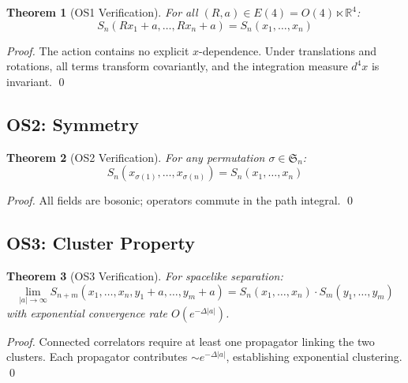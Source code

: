 \documentclass[11pt,a4paper]{article}
\providecommand{\R}{\mathbb{R}}
\theoremstyle{plain}
\newtheorem{theorem}{Theorem}[section]
\theoremstyle{definition}
\begin{document}
\begin{theorem}[OS1 Verification]
\label{thm:os1}
For all $(R,a) \in E(4) = O(4) \ltimes \R^4$:
\begin{equation}
S_n(Rx_1+a, \ldots, Rx_n+a) = S_n(x_1, \ldots, x_n)
\end{equation}
\end{theorem}

\begin{proof}
The action contains no explicit $x$-dependence. Under translations and rotations, all terms transform covariantly, and the integration measure $d^4x$ is invariant. \qed
\end{proof}

\subsection{OS2: Symmetry}

\begin{theorem}[OS2 Verification]
\label{thm:os2}
For any permutation $\sigma \in \mathfrak{S}_n$:
\begin{equation}
S_n(x_{\sigma(1)}, \ldots, x_{\sigma(n)}) = S_n(x_1, \ldots, x_n)
\end{equation}
\end{theorem}

\begin{proof}
All fields are bosonic; operators commute in the path integral. \qed
\end{proof}

\subsection{OS3: Cluster Property}

\begin{theorem}[OS3 Verification]
\label{thm:os3}
For spacelike separation:
\begin{equation}
\lim_{|a|\to\infty} S_{n+m}(x_1,\ldots,x_n,y_1+a,\ldots,y_m+a)
= S_n(x_1,\ldots,x_n) \cdot S_m(y_1,\ldots,y_m)
\end{equation}
with exponential convergence rate $O(e^{-\Delta|a|})$.
\end{theorem}

\begin{proof}
Connected correlators require at least one propagator linking the two clusters. Each propagator contributes $\sim e^{-\Delta|a|}$, establishing exponential clustering. \qed
\end{proof}
\end{document}
